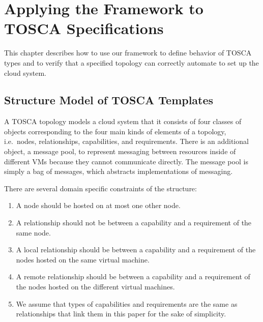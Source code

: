 \documentclass[12pt]{report}
\begin{document}
\chapter{Applying the Framework to TOSCA Specifications}
\label{chap:appTOSCA}
This chapter describes how to use our framework to define behavior of
TOSCA types and to verify that a specified topology can correctly
automate to set up the cloud system.

\section{Structure Model of TOSCA Templates}
\label{sec:TOSCAstructure}
A TOSCA topology models a cloud system that it consists of
four classes of objects corresponding to the four main kinds of
elements of a topology, i.e.\ nodes, relationships, capabilities, and
requirements. There is an additional object, a message pool, to
represent messaging between resources inside of different VMs because
they cannot communicate directly. The message pool is simply a bag of
messages, which abstracts implementations of messaging.

There are several domain specific constraints of the structure:
\begin{enumerate}
\item A node should be hosted on at most one other node.
\item A relationship should not be between a capability and a
  requirement of the same node.
\item A local relationship should be between a capability and a
  requirement of the nodes hosted on the same virtual machine.
\item A remote relationship should be between a capability and a
  requirement of the nodes hosted on the different virtual machines.
\item We assume that types of capabilities and requirements are
  the same as relationships that link them in this paper for the sake
  of simplicity.
\end{enumerate}

\end{document}
